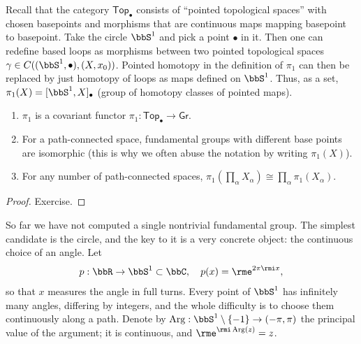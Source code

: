 \begin{defn}
    Recall that the category $\mathsf{Top}_\bullet$ consists of ``pointed topological spaces'' with chosen basepoints and morphisms that are continuous maps mapping basepoint to basepoint. Take the circle $\bbS^1$ and pick a point $\bullet$ in it. Then one can redefine based loops as morphisms between two pointed topological spaces $\gamma\in C((\bbS^1,\bullet),(X,x_0))$. Pointed homotopy in the definition of $\pi_1$ can then be replaced by just homotopy of loops as maps defined on $\bbS^1$. Thus, as a set, $\pi_1(X)=[\bbS^1,X]_\bullet$ (group of homotopy classes of pointed maps).
\end{defn}

\begin{prop}\label{prop computing pi1}
\begin{enumerate}
    \item $\pi_1$ is a covariant functor $\pi_1:\mathsf{Top}_\bullet\to \mathsf{Gr}$.
    \item For a path-connected space, fundamental groups with different base points are isomorphic (this is why we often abuse the notation by writing $\pi_1(X)$).
    \item For any number of path-connected spaces, $\pi_1(\prod_\alpha X_\alpha)\cong \prod_\alpha \pi_1(X_\alpha)$.
\end{enumerate}
\end{prop}
\begin{proof}
Exercise.
\end{proof}

So far we have not computed a single nontrivial fundamental group. The simplest candidate is the circle, and the key to it is a very concrete object: the continuous choice of an angle. Let
\[p:\bbR\to\bbS^1\subset\bbC,\quad p(x)=\rme^{2\pi\rmi x},\]
so that $x$ measures the angle in full turns. Every point of $\bbS^1$ has infinitely many angles, differing by integers, and the whole difficulty is to choose them continuously along a path. Denote by $\mathrm{Arg}:\bbS^1\setminus\{-1\}\to(-\pi,\pi)$ the principal value of the argument; it is continuous, and $\rme^{\rmi\,\mathrm{Arg}(z)}=z$.

